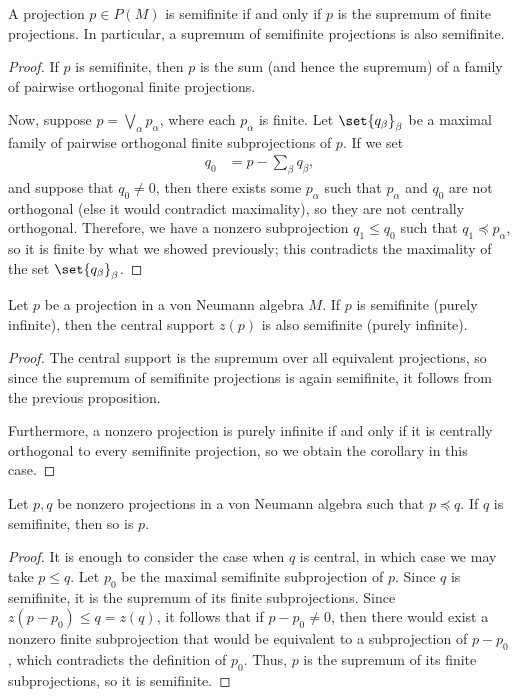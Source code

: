\documentclass[10pt]{mypackage}
\begin{document}
\begin{proposition}
  A projection $p\in P(M)$ is semifinite if and only if $p$ is the supremum of finite projections. In particular, a supremum of semifinite projections is also semifinite.
\end{proposition}
\begin{proof}
  If $p$ is semifinite, then $p$ is the sum (and hence the supremum) of a family of pairwise orthogonal finite projections.

  Now, suppose $p = \bigvee_{\alpha}p_{\alpha}$, where each $p_{\alpha}$ is finite. Let $\set{q_{\beta}}_{\beta}$ be a maximal family of pairwise orthogonal finite subprojections of $p$. If we set
  \begin{align*}
    q_0 &= p - \sum_{\beta}q_{\beta},
  \end{align*}
  and suppose that $q_0\neq 0$, then there exists some $p_{\alpha}$ such that $p_{\alpha}$ and $q_0$ are not orthogonal (else it would contradict maximality), so they are not centrally orthogonal. Therefore, we have a nonzero subprojection $q_1 \leq q_0$ such that $q_1\preceq p_{\alpha}$, so it is finite by what we showed previously; this contradicts the maximality of the set $\set{q_{\beta}}_{\beta}$.
\end{proof}
\begin{corollary}
  Let $p$ be a projection in a von Neumann algebra $M$. If $p$ is semifinite (purely infinite), then the central support $z(p)$ is also semifinite (purely infinite).
\end{corollary}
\begin{proof}
  The central support is the supremum over all equivalent projections, so since the supremum of semifinite projections is again semifinite, it follows from the previous proposition.

  Furthermore, a nonzero projection is purely infinite if and only if it is centrally orthogonal to every semifinite projection, so we obtain the corollary in this case.
\end{proof}
\begin{corollary}
  Let $p,q$ be nonzero projections in a von Neumann algebra such that $p\preceq q$. If $q$ is semifinite, then so is $p$.
\end{corollary}
\begin{proof}
  It is enough to consider the case when $q$ is central, in which case we may take $p\leq q$. Let $p_0$ be the maximal semifinite subprojection of $p$. Since $q$ is semifinite, it is the supremum of its finite subprojections. Since $z\left( p-p_0 \right)\leq q = z(q)$, it follows that if $p-p_0\neq 0$, then there would exist a nonzero finite subprojection that would be equivalent to a subprojection of $p-p_0$, which contradicts the definition of $p_0$. Thus, $p$ is the supremum of its finite subprojections, so it is semifinite.
\end{proof}
\end{document}
